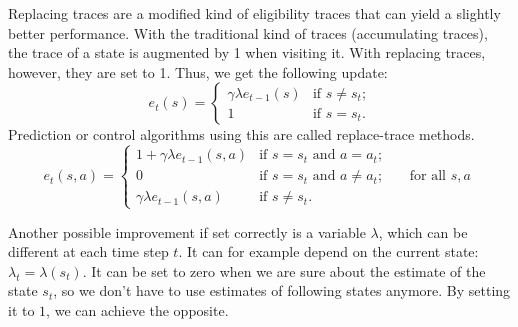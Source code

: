 \documentclass[a4paper]{article}
\begin{document}
Replacing traces are a modified kind of eligibility traces that can yield a slightly better performance. With the traditional kind of traces (accumulating traces), the trace of a state is augmented by 1 when visiting it. With replacing traces, however, they are set to 1. Thus, we get the following update:
\begin{equation}
e_t(s) = \begin{cases}
\gamma \lambda e_{t-1}(s) & \text{if $s \neq s_t$;}\\
1 & \text{if $s=s_t$.}
\end{cases}
\end{equation}
Prediction or control algorithms using this are called replace-trace methods.
\begin{equation}
e_t(s,a) = \begin{cases}
1 + \gamma \lambda e_{t-1}(s,a) & \text{if $s=s_t$ and $a=a_t$;}\\
0 & \text{if $s=s_t$ and $a \neq a_t$;} \qquad \text{for all $s,a$}\\
\gamma \lambda e_{t-1}(s,a) & \text{if $s \neq s_t$.}
\end{cases}
\end{equation}

Another possible improvement if set correctly is a variable $\lambda$, which can be different at each time step $t$. It can for example depend on the current state: $\lambda_t = \lambda(s_t)$. It can be set to zero when we are sure about the estimate of the state $s_t$, so we don't have to use estimates of following states anymore. By setting it to $1$, we can achieve the opposite.

\end{document}
